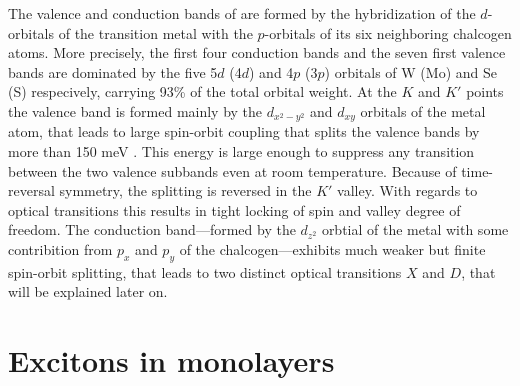 The valence and conduction bands of \tmds are formed by the hybridization of the $d$-orbitals of the transition metal with the $p$-orbitals of its six neighboring chalcogen atoms. More precisely, the first four conduction bands and the seven first valence bands are dominated by the five 5$d$ (4$d$) and 4$p$ (3$p$) orbitals of W (Mo) and Se (S) respecively, carrying 93\% of the total orbital weight\cite{cappelluti_tight-binding_2013,silva-guillen_electronic_2016}. At the $K$ and $K'$ points the valence band is formed mainly by the $d_{x^2-y^2}$ and $d_{xy}$ orbitals of the metal atom, that leads to large spin-orbit coupling that splits the valence bands by more than 150 meV \cite{zhu_giant_2011}. This energy is large enough to suppress any transition between the two valence subbands even at room temperature. Because of time-reversal symmetry, the splitting is reversed in the $K'$ valley. With regards to optical transitions this results in tight locking of spin and valley degree of freedom. The conduction band---formed by the $d_{z^2}$ orbtial of the metal with some contribition from $p_x$ and $p_y$ of the chalcogen---exhibits much weaker but finite spin-orbit splitting, that leads to two distinct optical transitions $X$ and $D$, that will be explained later on.

\section{Excitons in \tmdg monolayers}\label{theory_exciton}


